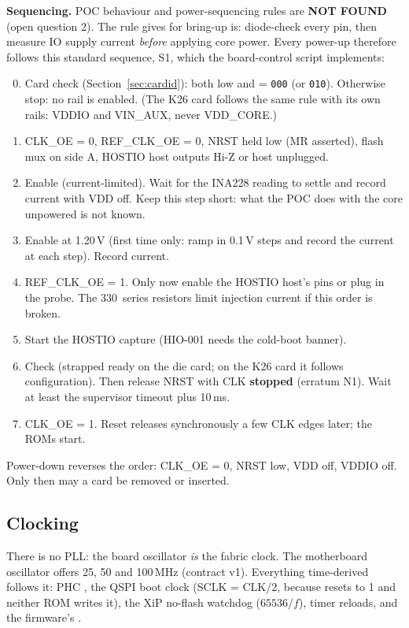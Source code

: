 \documentclass[10pt,a4paper]{article}
\newcommand\src{\leavevmode\begingroup\color{srcgray}\srcaux}
\newcommand\srcaux[1]{\srcraw{#1}\endgroup}
\newcommand\NF{\textcolor{warn}{\textbf{NOT FOUND}}}
\begin{document}
\textbf{Sequencing.} POC behaviour and power-sequencing rules are \NF{} (open question 2). The rule \src{REG:473-477} gives for bring-up is: diode-check every pin, then measure IO supply current \emph{before} applying core power. Every power-up therefore follows this standard sequence, S1, which the board-control script implements:
\begin{enumerate}
\setcounter{enumi}{-1}
\item Card check (Section~\ref{sec:cardid}): both  low and  = \texttt{000} (or \texttt{010}). Otherwise stop: no rail is enabled. (The K26 card follows the same rule with its own rails: VDDIO and VIN\_AUX, never VDD\_CORE.)
\item CLK\_OE = 0, REF\_CLK\_OE = 0, NRST held low (MR asserted), flash mux on side A, HOSTIO host outputs Hi-Z or host unplugged.
\item Enable  (current-limited). Wait for the INA228 reading to settle and record  current with VDD off. Keep this step short: what the POC does with the core unpowered is not known.
\item Enable  at 1.20\,V (first time only: ramp in 0.1\,V steps and record the current at each step). Record  current.
\item REF\_CLK\_OE = 1. Only now enable the HOSTIO host's pins or plug in the probe. The 330\,\textohm{} series resistors limit injection current if this order is broken.
\item Start the HOSTIO capture (HIO-001 needs the cold-boot banner).
\item Check  (strapped ready on the die card; on the K26 card it follows configuration). Then release NRST with CLK \textbf{stopped} (erratum N1). Wait at least the supervisor timeout plus 10\,ms.
\item CLK\_OE = 1. Reset releases synchronously a few CLK edges later; the ROMs start.
\end{enumerate}
Power-down reverses the order: CLK\_OE = 0, NRST low, VDD off, VDDIO off. Only then may a card be removed or inserted.

\subsection{Clocking}
There is no PLL: the board oscillator \emph{is} the fabric clock. The motherboard oscillator offers 25, 50 and 100\,MHz (contract v1). Everything time-derived follows it: PHC , the QSPI boot clock (SCLK = CLK/2, because  resets to 1 and neither ROM writes it), the XiP no-flash watchdog ($65536/f$), timer reloads, and the firmware's .
\end{document}
